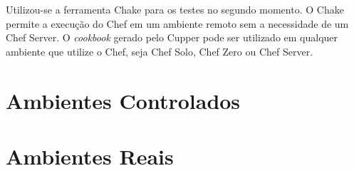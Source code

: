 Utilizou-se a ferramenta Chake para os testes no segundo momento. O Chake
permite a execução do Chef em um ambiente remoto sem a necessidade de um
Chef Server. O \textit{cookbook} gerado pelo Cupper pode ser utilizado em qualquer
ambiente que utilize o Chef, seja Chef Solo, Chef Zero ou Chef Server.

\section{Ambientes Controlados}


\section{Ambientes Reais}




